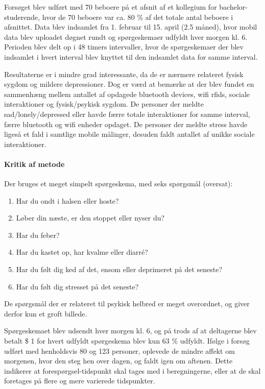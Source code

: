 Forsøget blev udført med 70 beboere på et afsnit af et kollegium for bachelor-studerende, hvor de 70 beboere var ca. 80 \% af det totale antal beboere i afsnittet.
Data blev indsamlet fra 1. februar til 15. april (2.5 måned), hvor mobil data blev uploadet døgnet rundt og spørgeskemaer udfyldt hver morgen kl. 6.
Perioden blev delt op i 48 timers intervaller, hvor de spørgeskemaer der blev indsamlet i hvert interval blev knyttet til den indsamlet data for samme interval.

Resultaterne er i mindre grad interessante, da de er nærmere relateret fysisk sygdom og mildere depressioner.
Dog er værd at bemærke at der blev fundet en sammenhæng mellem antallet af opdagede bluetooth devices, wifi rfids, sociale interaktioner og fysisk/psykisk sygdom.
De personer der meldte sad/lonely/depressed eller havde færre totale interaktioner for samme interval, færre bluetooth og wifi enheder opdaget.
De personer der meldte stress havde ligeså et fald i samtlige mobile målinger, desuden faldt antallet af unikke sociale interaktioner.

\paragraph{Kritik af metode}
Der bruges et meget simpelt spørgeskema, med seks spørgsmål (oversat):
\begin{enumerate}
\item Har du ondt i halsen eller hoste?
\item Løber din næste, er den stoppet eller nyser du?
\item Har du feber?
\item Har du kastet op, har kvalme eller diarré?
\item Har du følt dig ked af det, ensom eller deprimeret på det seneste?
\item Har du følt dig stresset på det seneste?
\end{enumerate}

De spørgsmål der er relateret til psykisk helbred er meget overordnet, og giver derfor kun et groft billede.

Spørgeskemaet blev udsendt hver morgen kl. 6, og på trods af at deltagerne blev betalt \$ 1 for hvert udfyldt spørgeskema blev kun 63 \% udfyldt.
Ifølge \citet{panas} i forsøg udført med henholdsvis 80 og 123 personer, oplevede de mindre affekt om morgenen, hvor den steg hen over dagen, og faldt igen om aftenen.
Dette indikerer at forespørgsel-tidspunkt skal tages med i beregningerne, eller at de skal foretages på flere og mere varierede tidspunkter.

